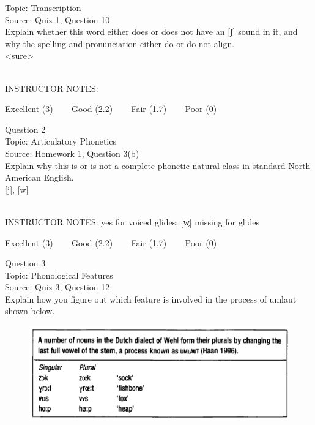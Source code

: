 \documentclass[12pt]{article}
\begin{document}
Topic: Transcription\\
Source: Quiz 1, Question 10\\

Explain whether this word either does or does not have an [ʃ] sound in it, and why the spelling and pronunciation either do or do not align.\\

<sure>


~\\
INSTRUCTOR NOTES: 


\vfill
Excellent (3) ~~~ Good (2.2) ~~~ Fair (1.7) ~~~ Poor (0)
\newpage

{\large Question 2}\\

Topic: Articulatory Phonetics\\
Source: Homework 1, Question 3(b)\\

Explain why this is or is not a complete phonetic natural class in standard North American English.\\

{[j]}, {[w]}


~\\
INSTRUCTOR NOTES: yes for voiced glides; [w̥] missing for glides


\vfill
Excellent (3) ~~~ Good (2.2) ~~~ Fair (1.7) ~~~ Poor (0)
\newpage

{\large Question 3}\\

Topic: Phonological Features\\
Source: Quiz 3, Question 12\\

Explain how you figure out which feature is involved in the process of umlaut shown below.\\

\begin{figure}[H]
\includegraphics{../images/dutch.png}
\end{figure}
\end{document}
